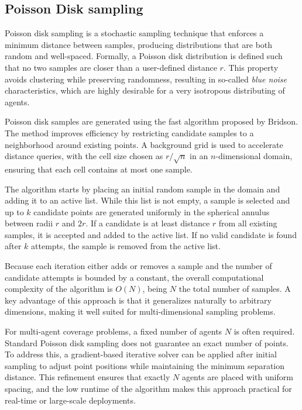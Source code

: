 \subsection{Poisson Disk sampling} \label{sec.3:Poisson sampling disk}

Poisson disk sampling is a stochastic sampling technique that enforces a minimum distance between samples, producing distributions that are both random and well-spaced. Formally, a Poisson disk distribution is defined such that no two samples are closer than a user-defined distance \( r \). This property avoids clustering while preserving randomness, resulting in so-called \emph{blue noise} characteristics, which are highly desirable for a very isotropous distributing of agents.

Poisson disk samples are generated using the fast algorithm proposed by Bridson\cite{poisson_sampling_disk}. The method improves efficiency by restricting candidate samples to a neighborhood around existing points. A background grid is used to accelerate distance queries, with the cell size chosen as \( r / \sqrt{n} \) in an \( n \)-dimensional domain, ensuring that each cell contains at most one sample.

The algorithm starts by placing an initial random sample in the domain and adding it to an active list. While this list is not empty, a sample is selected and up to \( k \) candidate points are generated uniformly in the spherical annulus between radii \( r \) and \( 2r \). If a candidate is at least distance \( r \) from all existing samples, it is accepted and added to the active list. If no valid candidate is found after \( k \) attempts, the sample is removed from the active list.

Because each iteration either adds or removes a sample and the number of candidate attempts is bounded by a constant, the overall computational complexity of the algorithm is \( O(N) \), being \( N \) the total number of samples. A key advantage of this approach is that it generalizes naturally to arbitrary dimensions, making it well suited for multi-dimensional sampling problems.

For multi-agent coverage problems, a fixed number of agents \( N \) is often required. Standard Poisson disk sampling does not guarantee an exact number of points. To address this, a gradient-based iterative solver can be applied after initial sampling to adjust point positions while maintaining the minimum separation distance. This refinement ensures that exactly \( N \) agents are placed with uniform spacing, and the low runtime of the algorithm makes this approach practical for real-time or large-scale deployments.

